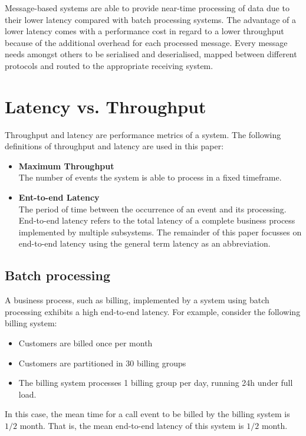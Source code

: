 Message-based systems are able to provide near-time processing of data due to their lower latency compared with batch processing systems. The advantage of a lower latency comes with a performance cost in regard to a lower throughput because of the additional overhead for each processed message. Every message needs amongst others to be serialised and deserialised, mapped between different protocols and routed to the appropriate receiving system.

\section{Latency vs. Throughput}\label{sec:ch2_latency_throughput}
Throughput and latency are performance metrics of a system. The following definitions of throughput and latency are used in this paper:
\begin{itemize}
	\item \textbf{Maximum Throughput}\\
	The number of events the system is able to process in a fixed timeframe.
 	\item \textbf{Ent-to-end Latency}\\
	The period of time between the occurrence of an event and its processing. End-to-end latency refers to the total latency of a complete business process implemented by multiple subsystems. The remainder of this paper focusses on end-to-end latency using the general term latency as an abbreviation.
\end{itemize}
\subsection{Batch processing}
A business process, such as billing, implemented by a system using batch processing exhibits a high end-to-end latency. For example, consider the following billing system:
\begin{itemize}
	\item Customers are billed once per month
	\item Customers are partitioned in 30 billing groups
	\item The billing system processes 1 billing group per day, running 24h under full load.
\end{itemize}

In this case, the mean time for a call event to be billed by the billing system is $1/2$ month. That is, the mean end-to-end latency of this system is $1/2$ month.


